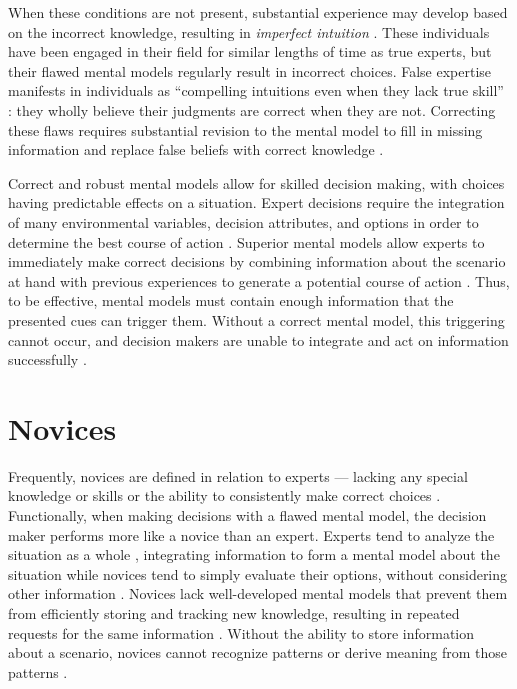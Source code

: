 When these conditions are not present, substantial experience may develop based on the incorrect knowledge, resulting in \emph{imperfect intuition} \citep{Kahneman2009}. These individuals have been engaged in their field for similar lengths of time as true experts, but their flawed mental models regularly result in incorrect choices. False expertise manifests in individuals as ``compelling intuitions even when they lack true skill'' \citep{Kahneman2009}: they wholly believe their judgments are correct when they are not. Correcting these flaws requires substantial revision to the mental model to fill in missing information and replace false beliefs with correct knowledge \citep{Klein2006, Chi2008}.

Correct and robust mental models allow for skilled decision making, with choices having predictable effects on a situation. Expert decisions require the integration of many environmental variables, decision attributes, and options in order to determine the best course of action \citep{Klein2008}. Superior mental models allow experts to immediately make correct decisions \citep{Klein1992} by combining information about the scenario at hand with previous experiences to generate a potential course of action \citep{Klein1999}. Thus, to be effective, mental models must contain enough information that the presented cues can trigger them. Without a correct mental model, this triggering cannot occur, and decision makers are unable to integrate and act on information successfully \citep{Lipshitz1997}.

\section{Novices}

Frequently, novices are defined in relation to experts --- lacking any special knowledge or skills or the ability to consistently make correct choices \citep{Lipshitz1997}. Functionally, when making decisions with a flawed mental model, the decision maker performs more like a novice than an expert. Experts tend to analyze the situation as a whole \citep{Calderwood1990}, integrating information to form a mental model about the situation \citep{Gott1986} while novices tend to simply evaluate their options, without considering other information \citep{Calderwood1990}. Novices lack well-developed mental models that prevent them from efficiently storing and tracking new knowledge, resulting in repeated requests for the same information \citep{Lipshitz1997}. Without the ability to store information about a scenario, novices cannot recognize patterns \citep{Shanteau1988} or derive meaning from those patterns \citep{Means1993}.

